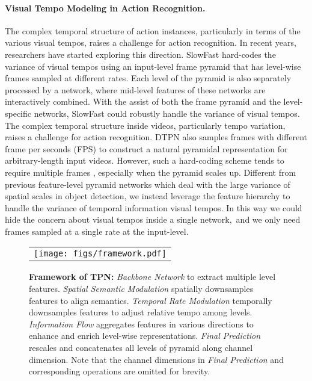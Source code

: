 \documentclass[10pt,twocolumn,letterpaper]{article}
\begin{document}
\paragraph{Visual Tempo Modeling in Action Recognition.}
The complex temporal structure of action instances, particularly in terms of the various visual tempos, raises a challenge for action recognition.
In recent years, researchers have started exploring this direction.
SlowFast \cite{slowfast} hard-codes the variance of visual tempos using an input-level frame pyramid that has level-wise frames sampled at different rates.
Each level of the pyramid is also separately processed by a network, where mid-level features of these networks are interactively combined.
With the assist of both the frame pyramid and the level-specific networks, SlowFast could robustly handle the variance of visual tempos.
The complex temporal structure inside videos, particularly tempo variation, raises a challenge for action recognition.
DTPN \cite{dtpn} also samples frames with different frame per seconds (FPS) to construct a natural pyramidal representation for arbitrary-length input videos.
However, such a hard-coding scheme tends to require multiple frames , especially when the pyramid scales up.
Different from previous feature-level pyramid networks \cite{Hypercolumns, fpn, panet, li2018feature} which deal with the large variance of spatial scales in object detection, we instead leverage the feature hierarchy to handle the variance of temporal information \ie visual tempos. 
In this way we could hide the concern about visual tempos inside a single network,\
and we only need frames sampled at a single rate at the input-level.
 \begin{figure*}[t]
    \centering
    \begin{tabular}{@{\hspace{0mm}}c}
    \texttt{[image: figs/framework.pdf]}
    \end{tabular}
    \caption{
        \textbf{Framework of TPN:}
        \emph{Backbone Network} to extract multiple level features.
        \emph{Spatial Semantic Modulation} spatially downsamples features to align semantics.
        \emph{Temporal Rate Modulation} temporally downsamples features to adjust relative tempo among levels.
        \emph{Information Flow} aggregates features in various directions to enhance and enrich level-wise representations.
        \emph{Final Prediction} rescales and concatenates all levels of pyramid along channel dimension. 
        Note that the channel dimensions in \emph{Final Prediction} and corresponding operations are omitted for brevity. 
    }
    \label{fig:framework}
    \end{figure*}
\end{document}
